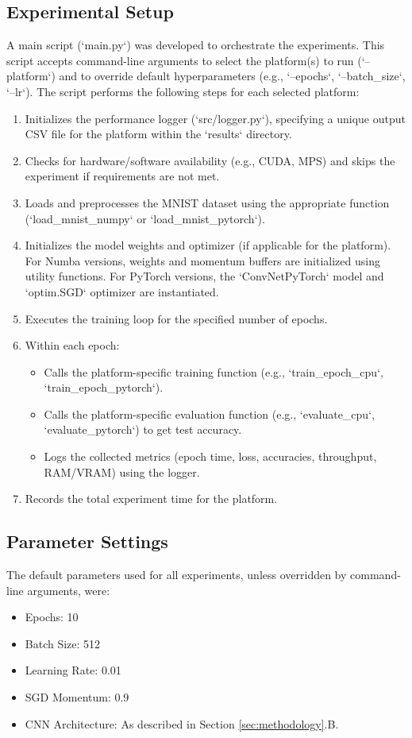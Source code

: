 \documentclass[conference]{IEEEtran} %
\begin{document}
\subsection{Experimental Setup}
A main script (`main.py`) was developed to orchestrate the experiments. This script accepts command-line arguments to select the platform(s) to run (`--platform`) and to override default hyperparameters (e.g., `--epochs`, `--batch_size`, `--lr`). The script performs the following steps for each selected platform:
\begin{enumerate}
    \item Initializes the performance logger (`src/logger.py`), specifying a unique output CSV file for the platform within the `results` directory.
    \item Checks for hardware/software availability (e.g., CUDA, MPS) and skips the experiment if requirements are not met.
    \item Loads and preprocesses the MNIST dataset using the appropriate function (`load_mnist_numpy` or `load_mnist_pytorch`).
    \item Initializes the model weights and optimizer (if applicable for the platform). For Numba versions, weights and momentum buffers are initialized using utility functions. For PyTorch versions, the `ConvNetPyTorch` model and `optim.SGD` optimizer are instantiated.
    \item Executes the training loop for the specified number of epochs.
    \item Within each epoch:
        \begin{itemize}
            \item Calls the platform-specific training function (e.g., `train_epoch_cpu`, `train_epoch_pytorch`).
            \item Calls the platform-specific evaluation function (e.g., `evaluate_cpu`, `evaluate_pytorch`) to get test accuracy.
            \item Logs the collected metrics (epoch time, loss, accuracies, throughput, RAM/VRAM) using the logger.
        \end{itemize}
    \item Records the total experiment time for the platform.
\end{enumerate}

\subsection{Parameter Settings}
The default parameters used for all experiments, unless overridden by command-line arguments, were:
\begin{itemize}
    \item Epochs: 10
    \item Batch Size: 512
    \item Learning Rate: 0.01
    \item SGD Momentum: 0.9
    \item CNN Architecture: As described in Section \ref{sec:methodology}.B.
\end{itemize}
\end{document}
